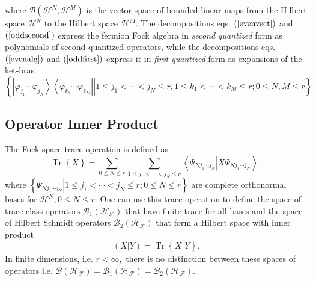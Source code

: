 \documentclass[aps,preprint]{revtex4}%
\begin{document}
where $\mathcal{B}\left(  \mathcal{H}^{N},\mathcal{H}^{M}\right)  $ is the
vector space of bounded linear maps from the Hilbert space $\mathcal{H}^{N}$
to the Hilbert space $\mathcal{H}^{M}.$ The decompositions eqs. $\left(
\ref{evenvect}\right)  $ and $\left(  \ref{oddsecond}\right)  $ express the
fermion Fock algebra in \emph{second quantized} form as polynomials of second
quantized operators, while the decompositions eqs. $\left(  \ref{evenalg}%
\right)  $ and $\left(  \ref{oddfirst}\right)  $ express it in \emph{first
quantized} form as expansions of the ket-bras
\begin{equation}
\left\{  \left.  \left\vert \varphi_{j_{1}}\cdots\varphi_{j_{N}}\right\rangle
\left\langle \varphi_{k_{1}}\cdots\varphi_{k_{M}}\right\vert \right\vert 1\leq
j_{1}<\cdots<j_{N}\leq r,1\leq k_{1}<\cdots<k_{M}\leq r;0\leq N,M\leq
r\right\}
\end{equation}


\subsection{Operator Inner Product \label{Inner prod}}

The Fock space trace operation is defined as
\begin{equation}
\operatorname*{Tr}\left\{  X\right\}  =\sum_{0\leq N\leq r}\sum_{1\leq
j_{1}<\cdots<j_{N}\leq r}\left\langle \Psi_{Nj_{1}\cdots j_{N}}\left\vert
X\Psi_{Nj_{1}\cdots j_{N}}\right.  \right\rangle ,
\end{equation}
where $\left\{  \left.  \Psi_{Nj_{1}\cdots j_{N}}\right\vert 1\leq
j_{1}<\cdots<j_{N}\leq r;0\leq N\leq r\right\}  $ are complete orthonormal
bases for $\mathcal{H}^{N},0\leq N\leq r.$ One can use this trace operation to
define the space of trace class operators $\mathcal{B}_{1}\left(
\mathcal{H}_{\mathcal{F}}\right)  $ that have finite trace for all bases and
the space of Hilbert Schmidt operators $\mathcal{B}_{2}\left(  \mathcal{H}%
_{\mathcal{F}}\right)  $ that form a Hilbert space with inner product
\begin{equation}
\left(  X\left\vert Y\right.  \right)  =\operatorname*{Tr}\left\{  X^{\dagger
}Y\right\}  .
\end{equation}
In finite dimensions, i.e. $r<\infty,$ there is no distinction between these
spaces of operators i.e. $\mathcal{B}\left(  \mathcal{H}_{\mathcal{F}}\right)
=\mathcal{B}_{1}\left(  \mathcal{H}_{\mathcal{F}}\right)  =\mathcal{B}%
_{2}\left(  \mathcal{H}_{\mathcal{F}}\right)  .$
\end{document}
